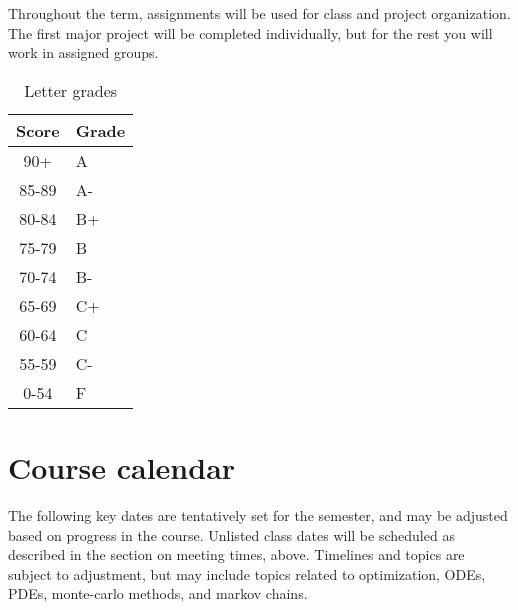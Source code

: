 \documentclass[12pt]{article}
\begin{document}
Throughout the term, assignments will be used for class and project organization. The first major project will be completed individually, but for the rest you will work in assigned groups.

\begin{table}[h]
  \caption{Letter grades}
\begin{center}
  \begin{tabular}{cl}
	\toprule
	Score & Grade \\
	\midrule
	90+     &         A \\
   85-89    &         A-\\
   80-84    &         B+\\
   75-79    &         B	\\
   70-74    &         B-\\
   65-69    &         C+\\
   60-64    &         C	\\
   55-59    &         C-\\
   0-54    &         F \\
   \bottomrule
  \end{tabular}
\end{center}
\end{table}
\newpage

\section*{Course calendar}
The following key dates are tentatively set for the semester, and may be adjusted based on progress in the course. Unlisted class dates will be scheduled as described in the section on meeting times, above. Timelines and topics are subject to adjustment, but may include topics related to optimization, ODEs, PDEs, monte-carlo methods, and markov chains.
\end{document}
